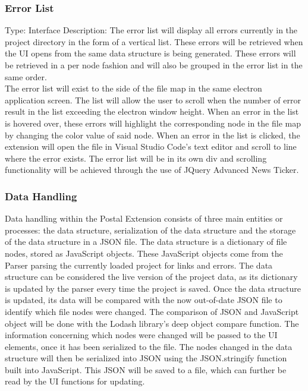 \documentclass[letterpaper,10pt,titlepage,draftclsnofoot,onecolumn,onesided] {IEEEtran}
\begin{document}
	\subsubsection{Error List}
	Type: Interface
	Description: 
	The error list will display all errors currently in the project directory in the form of a vertical list. 
	These errors will be retrieved when the UI opens from the same data structure is being generated. 
	These errors will be retrieved in a per node fashion and will also be grouped in the error list in the same order. 
	\\
	The error list will exist to the side of the file map in the same electron application screen. 
	The list will allow the user to scroll when the number of error result in the list exceeding the electron window height. 
	When an error in the list is hovered over, these errors will highlight the corresponding node in the file map by changing the color value of said node. 
	When an error in the list is clicked, the extension will open the file in Visual Studio Code's text editor and scroll to line where the error exists.
	The error list will be in its own div and scrolling functionality will be achieved through the use of JQuery Advanced News Ticker. \cite{newst}
	
	\subsubsection{Data Handling}
	Data handling within the Postal Extension consists of three main entities or processes: the data structure, serialization of the data structure and the storage of the data structure in a JSON file.
	The data structure is a dictionary of file nodes, stored as JavaScript objects. These JavaScript objects come from the Parser parsing the currently loaded project for links and errors.
	The data structure can be considered the live version of the project data, as its dictionary is updated by the parser every time the project is saved. 
	Once the data structure is updated, its data will be compared with the now out-of-date JSON file to identify which file nodes were changed.
	The comparison of JSON and JavaScript object will be done with the Lodash library's deep object compare function.
	The information concerning which nodes were changed will be passed to the UI elements, once it has been serialized to the file.
	The nodes changed in the data structure will then be serialized into JSON using the JSON.stringify function built into JavaScript.
	This JSON will be saved to a file, which can further be read by the UI functions for updating. \cite{stringify} \cite{lodash}
	
\end{document}
